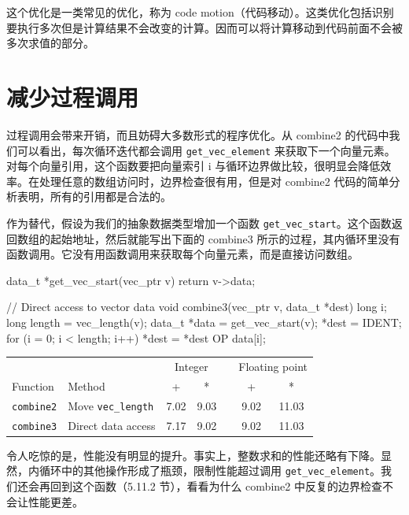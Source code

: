 这个优化是一类常见的优化，称为 code motion（代码移动）。这类优化包括识别要执行多次但是计算结果不会改变的计算。因而可以将计算移动到代码前面不会被多次求值的部分。

\section{减少过程调用}

过程调用会带来开销，而且妨碍大多数形式的程序优化。从 combine2 的代码中我们可以看出，每次循环迭代都会调用 \verb|get_vec_element| 来获取下一个向量元素。对每个向量引用，这个函数要把向量索引 i 与循环边界做比较，很明显会降低效率。在处理任意的数组访问时，边界检查很有用，但是对 combine2 代码的简单分析表明，所有的引用都是合法的。

作为替代，假设为我们的抽象数据类型增加一个函数 \verb|get_vec_start|。这个函数返回数组的起始地址，然后就能写出下面的 combine3 所示的过程，其内循环里没有函数调用。它没有用函数调用来获取每个向量元素，而是直接访问数组。

\begin{cppcode}
data_t *get_vec_start(vec_ptr v) {
  return v->data;
}
\end{cppcode}

\begin{cppcode}
// Direct access to vector data
void combine3(vec_ptr v, data_t *dest) {
  long i;
  long length = vec_length(v);
  data_t *data = get_vec_start(v);
  *dest = IDENT;
  for (i = 0; i < length; i++) {
    *dest = *dest OP data[i];
  }
}
\end{cppcode}

\begin{table}[!ht]
    \centering
    \begin{tabular}{llccccc}
        \toprule
        & & \multicolumn{2}{c}{Integer} & & \multicolumn{2}{c}{Floating point} \\
        \cmidrule{3-4} \cmidrule{6-7}
        Function & Method & + & * & & + & * \\
        \midrule
        \texttt{combine2} & Move \texttt{vec\_length} & 7.02 & 9.03 & & 9.02 & 11.03 \\
        \texttt{combine3} & Direct data access & 7.17 & 9.02 & & 9.02 & 11.03 \\
        \bottomrule
    \end{tabular}
\end{table}

令人吃惊的是，性能没有明显的提升。事实上，整数求和的性能还略有下降。显然，内循环中的其他操作形成了瓶颈，限制性能超过调用 \verb|get_vec_element|。我们还会再回到这个函数（5.11.2 节），看看为什么 combine2 中反复的边界检查不会让性能更差。

